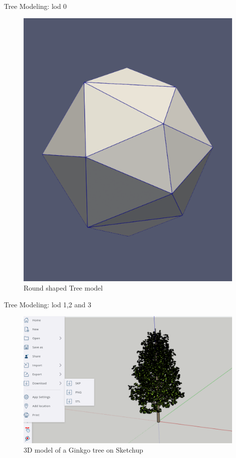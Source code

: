 \documentclass[10pt]{beamer}
\begin{document}
\begin{frame}{Tree Modeling: lod 0}
\begin{figure}[h]
\begin{minipage}{0.49\textwidth}
			\includegraphics[width=\textwidth]{images/round.png}
			\caption{Round shaped Tree model}
			\label{fig:figure2}
		\end{minipage}
	\end{figure}
\end{frame}

\begin{frame}{Tree Modeling: lod 1,2 and 3}
	\begin{figure}
		\centering
		\includegraphics[width=\textwidth]{images/ginkgo-sketchup.png}
		\caption{3D model of a Ginkgo tree on Sketchup}
		\label{fig:figure1}
	\end{figure}
\end{frame}
\end{document}
